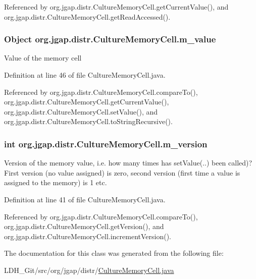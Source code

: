 Referenced by org.\-jgap.\-distr.\-Culture\-Memory\-Cell.\-get\-Current\-Value(), and org.\-jgap.\-distr.\-Culture\-Memory\-Cell.\-get\-Read\-Accessed().

\hypertarget{classorg_1_1jgap_1_1distr_1_1_culture_memory_cell_adbb7282e66ce0f1206eeb4cf8b00f9ea}{
\subsubsection[{m\-\_\-value}]{\setlength{\rightskip}{0pt plus 5cm}Object org.\-jgap.\-distr.\-Culture\-Memory\-Cell.\-m\-\_\-value\hspace{0.3cm}{\ttfamily [private]}}}\label{classorg_1_1jgap_1_1distr_1_1_culture_memory_cell_adbb7282e66ce0f1206eeb4cf8b00f9ea}
Value of the memory cell 

Definition at line 46 of file Culture\-Memory\-Cell.\-java.



Referenced by org.\-jgap.\-distr.\-Culture\-Memory\-Cell.\-compare\-To(), org.\-jgap.\-distr.\-Culture\-Memory\-Cell.\-get\-Current\-Value(), org.\-jgap.\-distr.\-Culture\-Memory\-Cell.\-set\-Value(), and org.\-jgap.\-distr.\-Culture\-Memory\-Cell.\-to\-String\-Recursive().

\hypertarget{classorg_1_1jgap_1_1distr_1_1_culture_memory_cell_af8363abf6c5aa7e2fb3c2aa10c8a8dc8}{
\subsubsection[{m\-\_\-version}]{\setlength{\rightskip}{0pt plus 5cm}int org.\-jgap.\-distr.\-Culture\-Memory\-Cell.\-m\-\_\-version\hspace{0.3cm}{\ttfamily [private]}}}\label{classorg_1_1jgap_1_1distr_1_1_culture_memory_cell_af8363abf6c5aa7e2fb3c2aa10c8a8dc8}
Version of the memory value, i.\-e. how many times has set\-Value(..) been called)? First version (no value assigned) is zero, second version (first time a value is assigned to the memory) is 1 etc. 

Definition at line 41 of file Culture\-Memory\-Cell.\-java.



Referenced by org.\-jgap.\-distr.\-Culture\-Memory\-Cell.\-compare\-To(), org.\-jgap.\-distr.\-Culture\-Memory\-Cell.\-get\-Version(), and org.\-jgap.\-distr.\-Culture\-Memory\-Cell.\-increment\-Version().



The documentation for this class was generated from the following file\-:\begin{DoxyCompactItemize}
\item 
L\-D\-H\-\_\-\-Git/src/org/jgap/distr/\hyperlink{_culture_memory_cell_8java}{Culture\-Memory\-Cell.\-java}\end{DoxyCompactItemize}
